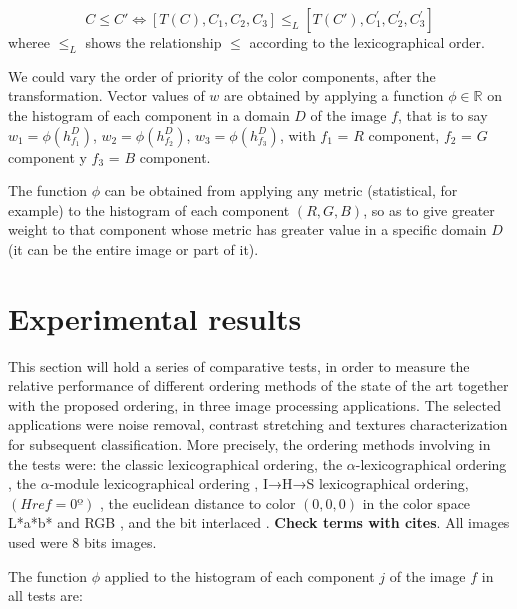 \begin{equation}
\label{Mio} 
 C\leq C'\Leftrightarrow [T(C),C_1,C_2,C_3] \leq_L [T(C'),C_1^{'},C_2^{'},C_3^{'}]
\end{equation} wheree $\leq_L$ shows the relationship $\leq$ according to the lexicographical order.	

We could vary the order of priority of the color components, after the transformation.
Vector values of $w$ are obtained by applying a function $\phi \in \mathbb{R}$ on the histogram of each component in a domain $D$ of the image $f$, that is to say $w_1 = \phi(h_{f_1}^D)$, $w_2 = \phi(h_{f_2}^D)$, $w_3 = \phi(h_{f_3}^D)$, with $f_1$ = $R$ component, $f_2$ = $G$ component y $f_3$ =  $B$ component.

The function $\phi$ can be obtained from applying any metric (statistical, for example) to the histogram of each component $(R,G,B)$, so as to give greater weight to that component whose metric has greater value in a specific domain $D$ (it can be the entire image or part of it). 

\section{Experimental results}
This section will hold a series of comparative tests, in order to measure the relative performance of different ordering methods of the state of the art together with the proposed ordering, in three image processing applications. The selected applications were noise removal, contrast stretching and textures characterization for subsequent classification.
More precisely, the ordering methods involving in the tests were:
the classic lexicographical ordering, the $\alpha$-lexicographical ordering \cite{zamora2001comparative}, the $\alpha$-module lexicographical ordering \cite{angulo2003morphological}, I→H→S lexicographical ordering, $(Href=0º)$ \cite{ortiz2004gaussian}, the euclidean distance to color $(0,0,0)$ in the color space L*a*b* and RGB \cite{ortiz2002procesamiento}, and the bit interlaced \cite{chanussot1997bit}. \textbf{Check terms with cites}.
All images used were $8$ bits images. 

The function $\phi$ applied to the histogram of each component $j$ of the image $f$ in all tests are:

